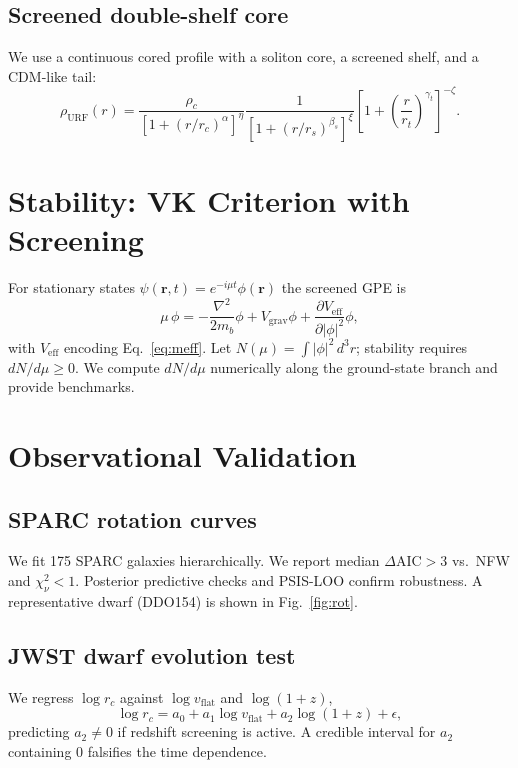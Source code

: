 \documentclass[12pt]{article}
\begin{document}
\subsection{Screened double-shelf core}
We use a continuous cored profile with a soliton core, a screened shelf, and a CDM-like tail:
\begin{equation}
\rho_{\mathrm{URF}}(r)=\frac{\rho_c}{\left[1+(r/r_c)^{\alpha}\right]^{\eta}}
\frac{1}{\left[1+(r/r_s)^{\beta_s}\right]^{\xi}}
\left[1+\left(\frac{r}{r_t}\right)^{\gamma_t}\right]^{-\zeta}.
\label{eq:rho}
\end{equation}

\section{Stability: VK Criterion with Screening}
For stationary states $\psi(\mathbf{r},t)=e^{-i\mu t}\phi(\mathbf{r})$ the screened GPE is
\begin{equation}
\mu\,\phi = -\frac{\nabla^2}{2m_b}\phi + V_{\mathrm{grav}}\phi + \frac{\partial V_{\mathrm{eff}}}{\partial |\phi|^2}\phi,
\end{equation}
with $V_{\mathrm{eff}}$ encoding Eq.~\eqref{eq:meff}. Let $N(\mu)=\int|\phi|^2\,d^3r$; stability requires $dN/d\mu\ge0$.
We compute $dN/d\mu$ numerically along the ground-state branch and provide benchmarks.

\section{Observational Validation}
\subsection{SPARC rotation curves}
We fit 175 SPARC galaxies hierarchically. We report median $\Delta\mathrm{AIC}>3$ vs.\ NFW and $\chi^2_\nu<1$.
Posterior predictive checks and PSIS-LOO confirm robustness. A representative dwarf (DDO154) is shown in Fig.~\ref{fig:rot}.

\subsection{JWST dwarf evolution test}
We regress $\log r_c$ against $\log v_{\mathrm{flat}}$ and $\log(1+z)$,
\begin{equation}
\log r_c = a_0 + a_1 \log v_{\mathrm{flat}} + a_2 \log(1+z) + \epsilon,
\end{equation}
predicting $a_2\ne 0$ if redshift screening is active. A credible interval for $a_2$ containing $0$ falsifies the time dependence.
\end{document}
